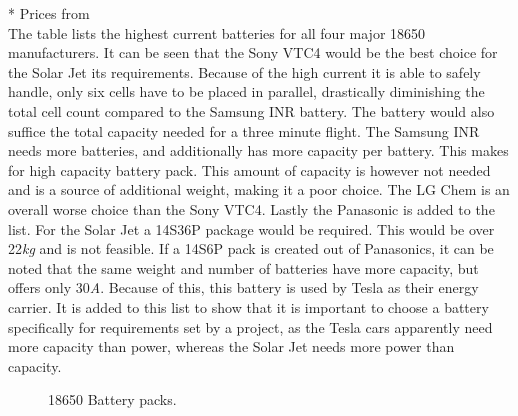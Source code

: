 * Prices from \cite{Nkon}\\
\newline
The table lists the highest current batteries for all four major 18650 manufacturers. It can be seen that the Sony VTC4 would be the best choice for the Solar Jet its requirements. Because of the high current it is able to safely handle, only six cells have to be placed in parallel, drastically diminishing the total cell count compared to the Samsung INR battery. The battery would also suffice the total capacity needed for a three minute flight. The Samsung INR needs more batteries, and additionally has more capacity per battery. This makes for high capacity battery pack. This amount of capacity is however not needed and is a source of additional weight, making it a poor choice. The LG Chem is an overall worse choice than the Sony VTC4. Lastly the Panasonic is added to the list. For the Solar Jet a 14S36P package would be required. This would be over 22\textit{kg} and is not feasible. If a 14S6P pack is created out of Panasonics, it can be noted that the same weight and number of batteries have more capacity, but offers only 30\textit{A}. Because of this, this battery is used by Tesla as their energy carrier. It is added to this list to show that it is important to choose a battery specifically for requirements set by a project, as the Tesla cars apparently need more capacity than power, whereas the Solar Jet needs more power than capacity.
\begin{figure}[H]
  \centering
  \hfill
  \caption{18650 Battery packs.}
  \label{Fig:18650_battery_packs}
\end{figure}
